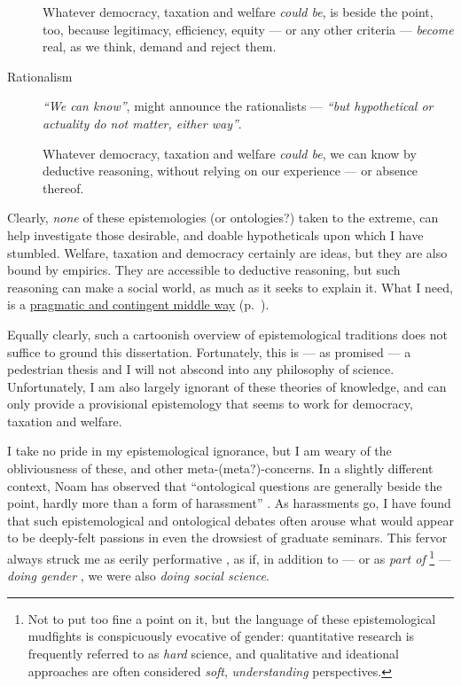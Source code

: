 \begin{description}
	Whatever democracy, taxation and welfare \emph{could be}, is beside the point, too, because legitimacy, efficiency, equity --- or any other criteria --- \emph{become} real, as we think, demand and reject them.
	
	\item[Rationalism \phantomsection \label{itm:rationalism}]
	\emph{``We can know''}, might announce the rationalists \citep{Descartes1637,Spinoza1662,Leibniz1704} --- \emph{``but hypothetical or actuality do not matter, either way''}.
	
	Whatever democracy, taxation and welfare \emph{could be}, we can know by deductive reasoning, without relying on our experience --- or absence thereof.
\end{description}


	
Clearly, \emph{none} of these epistemologies (or ontologies?) taken to the extreme, can help investigate those desirable, and doable hypotheticals upon which I have stumbled. 
Welfare, taxation and democracy certainly are ideas, but they are also bound by empirics. 
They are accessible to deductive reasoning, but such reasoning can make a social world, as much as it seeks to explain it. 
What I need, is a \hyperref[sec:epistemology]{pragmatic and contingent middle way} (p.~\pageref{sec:epistemology}). %

Equally clearly, such a cartoonish overview of epistemological traditions does not suffice to ground this dissertation. 
Fortunately, this is --- as promised --- a pedestrian thesis and I will not abscond into any philosophy of science. 
Unfortunately, I am also largely ignorant of these theories of knowledge, and can only provide a provisional epistemology that seems to work for democracy, taxation and welfare. 

I take no pride in my epistemological ignorance, but I am weary of the obliviousness of these, and other meta-(meta?)-concerns. 
In a slightly different context, Noam \citeauthor{Chomsky1997} has observed that ``ontological questions are generally beside the point, hardly more than a form of harassment'' \citeyearpar[132]{Chomsky1997}. 
As harassments go, I have found that such epistemological and ontological debates often arouse what would appear to be deeply-felt passions in even the drowsiest of graduate seminars. 
This fervor always struck me as eerily performative \cite[compare][]{Goffman1959,Butler1997}, as if, in addition to --- or as \emph{part of}
\footnote{
	Not to put too fine a point on it, but the language of these epistemological mudfights is conspicuously evocative of gender: quantitative research is frequently referred to as \emph{hard} science, and qualitative and ideational approaches are often considered \emph{soft}, \emph{understanding} perspectives.
}
--- \emph{doing gender} \citep{West1987}, we were also \emph{doing social science}.


